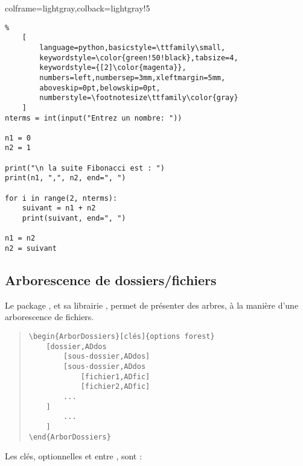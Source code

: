 \documentclass[11pt,a4paper]{ltxdoc}
\begin{document}
\begin{tcblisting}{colframe=lightgray,colback=lightgray!5}
\begin{VisionnPY}[Largeur=12cm]{}
\begin{lstlisting}%
    [
        language=python,basicstyle=\ttfamily\small,
        keywordstyle=\color{green!50!black},tabsize=4,
        keywordstyle={[2]\color{magenta}},
        numbers=left,numbersep=3mm,xleftmargin=5mm,
        aboveskip=0pt,belowskip=0pt,
        numberstyle=\footnotesize\ttfamily\color{gray}
    ]
nterms = int(input("Entrez un nombre: "))

n1 = 0
n2 = 1

print("\n la suite Fibonacci est : ")
print(n1, ",", n2, end=", ")

for i in range(2, nterms):
    suivant = n1 + n2
    print(suivant, end=", ")

n1 = n2
n2 = suivant
\end{lstlisting}
\end{VisionnPY}
\end{tcblisting}

\pagebreak

\subsection{Arborescence de dossiers/fichiers}

Le package , et sa librairie , permet de présenter des arbres, à la manière d'une arborescence de fichiers.

\begin{quote}
\begin{verbatim}
\begin{ArborDossiers}[clés]{options forest}
    [dossier,ADdos
        [sous-dossier,ADdos]
        [sous-dossier,ADdos
            [fichier1,ADfic]
            [fichier2,ADfic]
        ...
    ]
        ...
    ]
\end{ArborDossiers}
\end{verbatim}
\end{quote}

Les \textsf{clés}, optionnelles et entre \MontreCode{[...]}, sont :
\end{document}
